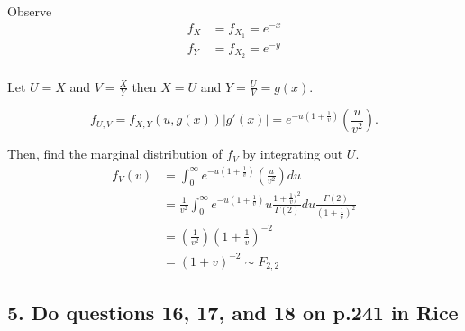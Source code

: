 \documentclass{tufte-book}
\begin{document}
Observe
\begin{align*}
f_X &= f_{X_1} = e^{-x} \\
f_Y &= f_{X_2} = e^{-y} \\
\end{align*}

Let $U=X$ and $V=\frac{X}{Y}$ then $X=U$ and $Y=\frac{U}{V}=g(x)$.

\[ f_{U,V} = f_{X,Y}(u, g(x))|g'(x)| = e^{-u(1+\frac{1}{v})}(\frac{u}{v^2}). \]

Then, find the marginal distribution of $f_V$ by integrating out $U$.
\begin{align*}
f_V(v) &= \int_{0}^{\infty}e^{-u(1+\frac{1}{v})}(\frac{u}{v^2})du \\
&= \frac{1}{v^2} \int_{0}^{\infty}e^{-u(1+\frac{1}{v})}u\frac{1+\frac{1}{v})^2}{\Gamma(2)}du\frac{\Gamma(2)}{(1+\frac{1}{v})^2}\\
&= (\frac{1}{v^2}) (1+\frac{1}{v})^{-2}\\
&= (1+v)^{-2} \sim F_{2,2}
\end{align*}

\subsection{5. Do questions 16, 17, and 18 on p.241 in Rice}
\end{document}
